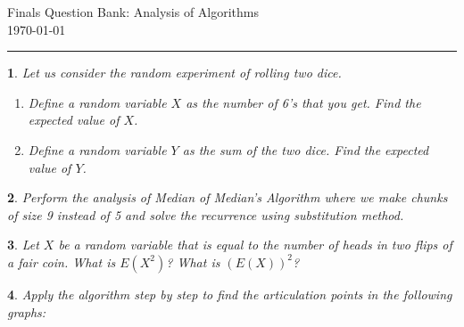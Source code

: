\documentclass[%
addpoints]{exam}
\theoremstyle{problem}
\newtheorem{p}{}
\begin{document}
 \pagestyle{empty}
 \begin{FlushLeft}
Finals Question Bank: Analysis of Algorithms\\
\today
\end{FlushLeft}

	
\thispagestyle{myheadings}
\rule{500pt}{1.5pt}

\begin{p}
Let us consider the random experiment of rolling two dice.
\begin{enumerate}
    \item Define a random variable \(X\) as the number of 6's that you get. Find the expected value of \(X\).
    \item Define a random variable \(Y\) as the sum of the two dice. Find the expected value of \(Y\).
\end{enumerate}
\hfill \end{p}

\begin{p}
Perform the analysis of Median of Median's Algorithm where we make chunks of size 9 instead of 5 and solve the recurrence using substitution method.
\hfill \end{p}

\begin{p}
Let \( X \) be a random variable that is equal to the number of heads in two flips of a  
fair coin. What is \( E(X^2) \)? What is \( (E(X))^2 \)?
\hfill \end{p}

\begin{p}
Apply the algorithm step by step to find the articulation points in the following graphs:
\end{p}

\begin{center}
\end{center}

\begin{center}
\end{center}
\end{document}
